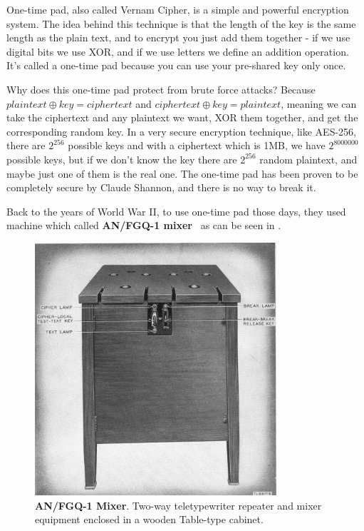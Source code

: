 One-time pad, also called Vernam Cipher, is a simple and powerful encryption
system. The idea behind this technique is that the length of the key is the same
length as the plain text, and to encrypt you just add them together - if we use
digital bits we use XOR, and if we use letters we define an addition operation.
It's called a one-time pad because you can use your pre-shared key only once.

Why does this one-time pad protect from brute force attacks? Because $plaintext
\oplus key = ciphertext$ and $ciphertext \oplus key = plaintext$, meaning we can
take the ciphertext and any plaintext we want, XOR them together, and get the
corresponding random key. In a very secure encryption technique, like AES-256,
there are \(2^{256}\) possible keys and with a ciphertext which is 1MB, we have
\(2^{8000000}\) possible keys, but if we don't know the key there are
\(2^{256}\) random plaintext, and maybe just one of them is the real one. The
one-time pad has been proven to be completely secure by Claude Shannon, and
there is no way to break it.

Back to the years of World War II, to use one-time pad those days, they used
machine which called \textbf{AN/FGQ-1 mixer}~\cite{cryptoMix} as can be seen in
.

\begin{figure}[!ht]
    \centering
    \includegraphics[width=0.8\textwidth]{images/ch1_Intro/MIxer.jpg}
    \caption{\textbf{AN/FGQ-1 Mixer}. Two-way teletypewriter repeater and mixer equipment enclosed in a wooden Table-type cabinet.} \label{fig:Mixer}
\end{figure}

